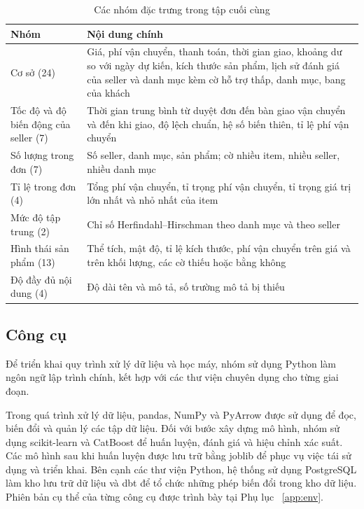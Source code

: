 \documentclass[12pt,a4paper]{report}
\begin{document}
\begin{table}[htbp]\centering\small
\caption{Các nhóm đặc trưng trong tập cuối cùng}\label{tab:features}
\begin{tabular}{p{4.2cm}p{9cm}}
\toprule
Nhóm & Nội dung chính \\
\midrule
Cơ sở (24) & Giá, phí vận chuyển, thanh toán, thời gian giao, khoảng dư so với ngày dự kiến, kích thước sản phẩm, lịch sử đánh giá của seller và danh mục kèm cờ hỗ trợ thấp, danh mục, bang của khách \\
Tốc độ và độ biến động của seller (7) & Thời gian trung bình từ duyệt đơn đến bàn giao vận chuyển và đến khi giao, độ lệch chuẩn, hệ số biến thiên, tỉ lệ phí vận chuyển \\
Số lượng trong đơn (7) & Số seller, danh mục, sản phẩm; cờ nhiều item, nhiều seller, nhiều danh mục \\
Tỉ lệ trong đơn (4) & Tổng phí vận chuyển, tỉ trọng phí vận chuyển, tỉ trọng giá trị lớn nhất và nhỏ nhất của item \\
Mức độ tập trung (2) & Chỉ số Herfindahl--Hirschman theo danh mục và theo seller \\
Hình thái sản phẩm (13) & Thể tích, mật độ, tỉ lệ kích thước, phí vận chuyển trên giá và trên khối lượng, các cờ thiếu hoặc bằng không \\
Độ đầy đủ nội dung (4) & Độ dài tên và mô tả, số trường mô tả bị thiếu \\
\bottomrule
\end{tabular}
\end{table}

\subsection{Công cụ}

Để triển khai quy trình xử lý dữ liệu và học máy, nhóm sử dụng Python làm ngôn ngữ lập trình chính, kết hợp với các thư viện chuyên dụng cho từng giai đoạn.

Trong quá trình xử lý dữ liệu, pandas, NumPy và PyArrow được sử dụng để đọc, biến đổi và quản lý các tập dữ liệu. Đối với bước xây dựng mô hình, nhóm sử dụng scikit-learn và CatBoost để huấn luyện, đánh giá và hiệu chỉnh xác suất. Các mô hình sau khi huấn luyện được lưu trữ bằng joblib để phục vụ việc tái sử dụng và triển khai. Bên cạnh các thư viện Python, hệ thống sử dụng PostgreSQL làm kho lưu trữ dữ liệu và dbt để tổ chức những phép biến đổi trong kho dữ liệu. Phiên bản cụ thể của từng công cụ được trình bày tại Phụ lục ~\ref{app:env}. 
\end{document}
